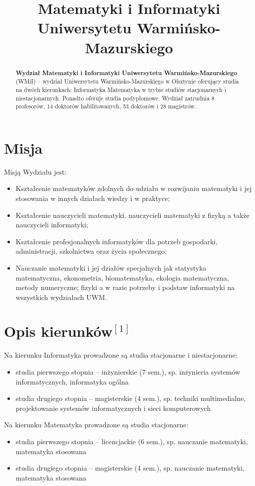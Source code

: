 \documentclass[a4paper,12pt]{article}
\title{\Wydział Matematyki i Informatyki Uniwersytetu
Warmińsko-Mazurskiego}
\author{}
\begin{document}
\maketitle

\begin{abstract}
\textbf{Wydział Matematyki i Informatyki Uniwersytetu Warmińsko-Mazurskiego} (WMiI) – wydział Uniwersytetu Warmińsko-Mazurskiego w Olsztynie oferujący studia na dwóch kierunkach:
Informatyka
Matematyka
w trybie studiów stacjonarnych i niestacjonarnych. Ponadto oferuje studia podyplomowe.
Wydział zatrudnia 8 profesorów, 14 doktorów habilitowanych, 53 doktorów i 28 magistrów.
\end{abstract}


\section{Misja}
Misją Wydziału jest:
\begin{itemize}
\item Kształcenie matematyków zdolnych do udziału w rozwijaniu matematyki i jej stosowania w innych działach wiedzy i w praktyce;
\item Kształcenie nauczycieli matematyki, nauczycieli matematyki z fizyką a także nauczycieli informatyki;
\item Kształcenie profesjonalnych informatyków dla potrzeb gospodarki, administracji, szkolnictwa oraz życia społecznego;
\item Nauczanie matematyki i jej działów specjalnych jak statystyka matematyczna, ekonometria, biomatematyka, ekologia matematyczna, metody numeryczne; fizyki a w razie potrzeby i podstaw informatyki na wszystkich wydziałach UWM.
\end{itemize}

\section{Opis kierunków$^{[1]}$}
Na kierunku Informatyka prowadzone są studia stacjonarne i niestacjonarne:
\begin{itemize}
\item studia pierwszego stopnia – inżynierskie (7 sem.), sp. inżynieria systemów informatycznych, informatyka ogólna 
\item studia drugiego stopnia – magisterskie (4 sem.), sp. techniki multimedialne, projektowanie systemów informatycznych i sieci komputerowych
\end{itemize}

Na kierunku Matematyka prowadzone są studia stacjonarne:
\begin{itemize}
\item studia pierwszego stopnia – licencjackie (6 sem.), sp. nauczanie matematyki, matematyka stosowana
\item studia drugiego stopnia – magisterskie (4 sem.), sp. nauczanie matematyki, matematyka stosowana
\end{itemize}
\end{document}
